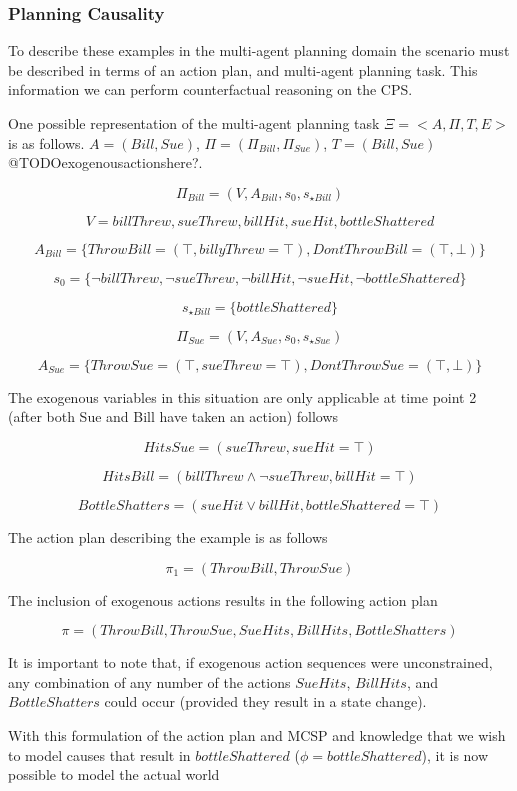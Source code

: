 \documentclass{article}
\theoremstyle{plain}
\theoremstyle{definition}
\begin{document}
\subsubsection*{Planning Causality}
To describe these examples in the multi-agent planning domain the scenario must be described in terms of an action plan, and multi-agent planning task. This information we can perform counterfactual reasoning on the CPS.

One possible representation of the multi-agent planning task $\Xi=<A, \Pi, T, E>$ is as follows. $A=(Bill, Sue)$, $\Pi=(\Pi_{Bill},\Pi_{Sue})$, $T= (Bill, Sue)$ @TODOexogenousactionshere?.

\[
\Pi_{Bill}=(V, A_{Bill}, s_0, s_{\star Bill})
\]

\[
V = {billThrew, sueThrew, billHit, sueHit, bottleShattered}
\]

\[
A_{Bill}=\{ThrowBill = (\top, billyThrew = \top), {DontThrowBill=(\top, \bot)} \}
\]

\[
s_0 = \{\lnot billThrew, \lnot sueThrew, \lnot billHit, \lnot sueHit, \lnot bottleShattered \}
\]

\[ s_{\star Bill} = \{bottleShattered\} \]

\[
\Pi_{Sue}=(V, A_{Sue}, s_0, s_{\star Sue})
\]

\[
A_{Sue}=\{ThrowSue = (\top, sueThrew = \top), {DontThrowSue=(\top, \bot)} \}
\]

The exogenous variables in this situation are only applicable at time point 2 (after both Sue and Bill have taken an action) follows

\[
HitsSue = (sueThrew, sueHit = \top)
\]

\[
HitsBill = (billThrew \land \lnot sueThrew, billHit = \top)
\]

\[
BottleShatters = (sueHit \lor billHit, bottleShattered = \top)
\]

The action plan describing the example is as follows

\[
\pi_1=(ThrowBill, ThrowSue)
\]

The inclusion of exogenous actions results in the following action plan

\[
\pi = (ThrowBill, ThrowSue, SueHits, BillHits, BottleShatters)
\]

It is important to note that, if exogenous action sequences were unconstrained, any combination of any number of the actions $SueHits$, $BillHits$, and $BottleShatters$ could occur (provided they result in a state change).

With this formulation of the action plan and MCSP and knowledge that we wish to model causes that result in $bottleShattered$ ($\phi=bottleShattered$), it is now possible to model the actual world 
\end{document}
